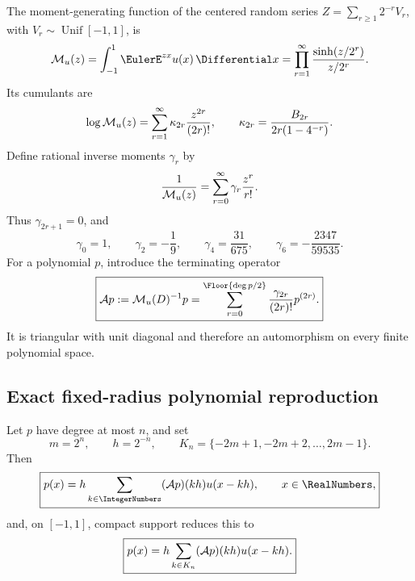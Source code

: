 The moment-generating function of the centered random series
$Z=\sum_{r\ge1}2^{-r}V_r$, with
$V_r\sim\operatorname{Unif}[-1,1]$, is
\begin{equation}
 \MGF_u(z)=\int_{-1}^{1}\EulerE^{zx}u(x)\,\Differential x
 =\prod_{r=1}^{\infty}
   \frac{\sinh(z/2^r)}{z/2^r}.
 \label{gq:eq:up-mgf}
\end{equation}
Its cumulants are
\begin{equation}
 \log\mathcal M_u(z)
 =\sum_{r=1}^{\infty}\kappa_{2r}\frac{z^{2r}}{(2r)!},
 \qquad
 \kappa_{2r}=\frac{B_{2r}}{2r(1-4^{-r})}.
 \label{gq:eq:up-cumulants}
\end{equation}
Define rational inverse moments $\gamma_r$ by
\begin{equation}
 \frac1{\mathcal M_u(z)}
 =\sum_{r=0}^{\infty}\gamma_r\frac{z^r}{r!}.
 \label{gq:eq:up-inverse-moments}
\end{equation}
Thus $\gamma_{2r+1}=0$, and
\begin{equation}
 \gamma_0=1,
 \qquad \gamma_2=-\frac19,
 \qquad \gamma_4=\frac{31}{675},
 \qquad \gamma_6=-\frac{2347}{59535}.
 \label{gq:eq:up-first-inverse-moments}
\end{equation}
For a polynomial $p$, introduce the terminating operator
\begin{equation}
 \boxed{
 \App p:=\MGF_u(D)^{-1}p
 =\sum_{r=0}^{\Floor{\deg p/2}}
   \frac{\gamma_{2r}}{(2r)!}p^{(2r)}.}
 \label{gq:eq:up-Appell-operator}
\end{equation}
It is triangular with unit diagonal and therefore an automorphism on every
finite polynomial space.

\subsection{Exact fixed-radius polynomial reproduction}

\begin{theorem}
\label{gq:thm:up-polynomial-synthesis}
Let $p$ have degree at most $n$, and set
\begin{equation}
 m=2^n,
 \qquad h=2^{-n},
 \qquad K_n=\{-2m+1,-2m+2,\ldots,2m-1\}.
 \label{gq:eq:up-synthesis-grid}
\end{equation}
Then
\begin{equation}
 \boxed{
 p(x)=h\sum_{k\in\IntegerNumbers}(\App p)(kh)u(x-kh),
 \qquad x\in\RealNumbers,}
 \label{gq:eq:up-global-synthesis}
\end{equation}
and, on $[-1,1]$, compact support reduces this to
\begin{equation}
 \boxed{
 p(x)=h\sum_{k\in K_n}(\mathcal A p)(kh)u(x-kh).}
 \label{gq:eq:up-finite-synthesis}
\end{equation}
\end{theorem}

